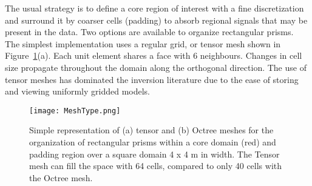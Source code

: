 The usual strategy is to define a core region of interest with a fine discretization and surround it by coarser cells (padding) to absorb regional signals that may be present in the data.
Two options are available to organize rectangular prisms.
The simplest implementation uses a regular grid, or tensor mesh shown in Figure~\ref{MeshType}(a). Each unit element shares a face with 6 neighbours. Changes in cell size propagate throughout the domain along the orthogonal direction. The use of tensor meshes has dominated the inversion literature due to the ease of storing and viewing uniformly gridded models.
\begin{figure}[h!]
{\centering
\texttt{[image: MeshType.png]}}
\caption{Simple representation of (a) tensor and (b) Octree meshes for the organization of rectangular prisms within a core domain (red) and padding region over a square domain 4 x 4 m in width. The Tensor mesh can fill the space with 64 cells, compared to only 40 cells with the Octree mesh.}
\label{MeshType}
\end{figure}

